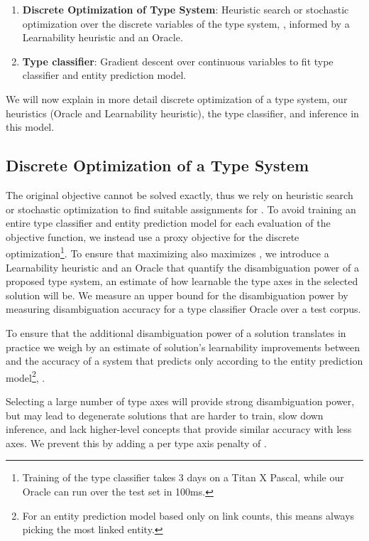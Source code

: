 \documentclass[letterpaper]{article}
\begin{document}
\begin{enumerate}
\item {\bf Discrete Optimization of Type System}: Heuristic search or stochastic optimization over the discrete variables of the type system, , informed by a Learnability heuristic and an Oracle.
\item {\bf Type classifier}: Gradient descent over continuous variables  to fit type classifier and entity prediction model.
\end{enumerate}

We will now explain in more detail discrete optimization of a type system, our heuristics (Oracle and Learnability heuristic), the type classifier, and inference in this model.

\subsection{Discrete Optimization of a Type System}
\label{para:objective}

The original objective  cannot be solved exactly, thus we rely on heuristic search or stochastic optimization to find suitable assignments for . To avoid training an entire type classifier and entity prediction model for each evaluation of the objective function, we instead use a proxy objective  for the discrete optimization\footnote{Training of the type classifier takes 3 days on a Titan X Pascal, while our Oracle can run over the test set in 100ms.}. To ensure that maximizing  also maximizes , we introduce a Learnability heuristic and an Oracle that quantify the disambiguation power of a proposed type system, an estimate of how learnable the type axes in the selected solution will be. We measure an upper bound for the disambiguation power by measuring disambiguation accuracy  for a type classifier Oracle over a test corpus.

To ensure that the additional disambiguation power of a solution  translates in practice we weigh by an estimate of solution's learnability  improvements between  and the accuracy of a system that predicts only according to the entity prediction model\footnote{For an entity prediction model based only on link counts, this means always picking the most linked entity.}, .

Selecting a large number of type axes will provide strong disambiguation power, but may lead to degenerate solutions that are harder to train, slow down inference, and lack higher-level concepts that provide similar accuracy with less axes. We prevent this by adding a per type axis penalty of .
\end{document}
